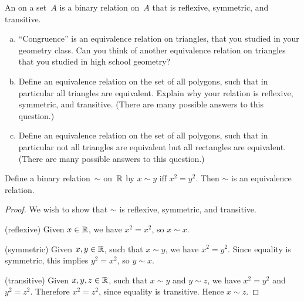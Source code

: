 \begin{defn}
An  on a set~$A$ is a binary relation on~$A$ that is reflexive, symmetric, and transitive.
\end{defn}

\begin{exer}
\begin{enumerate}[(a)]
\item
``Congruence'' is an equivalence relation on triangles, that you studied in your geometry class. Can you think of another equivalence relation on triangles that you studied in high school geometry?
\item
Define an equivalence relation on the set of all polygons, such that in particular all triangles are equivalent. Explain why your relation is reflexive, symmetric, and transitive. (There are many possible answers to this question.)  
\item
Define an equivalence relation on the set of all polygons, such that in particular not all triangles are equivalent but all rectangles are equivalent. (There are many possible answers to this question.)
\end{enumerate}
\end{exer}

\begin{eg}
Define a binary relation~$\sim$ on~$\mathbb{R}$ by $x \sim y$ iff $x^2 = y^2$. Then $\sim$ is an equivalence relation.

\begin{proof}
We wish to show that $\sim$ is reflexive, symmetric, and transitive.

\noindent
(reflexive) Given $x \in \mathbb{R} $, we have $x^2 = x^2$, so $x \sim x$.

\noindent
(symmetric) Given $x,y \in \mathbb{R}$, such that $x \sim y$, we have $x^2 = y^2$. Since equality is symmetric, this implies $y^2 = x^2$, so $y \sim x$.

\noindent
(transitive) Given $x,y,z \in \mathbb{R}$, such that $x \sim y$ and $y \sim z$, we have $x^2 = y^2$ and $y^2 = z^2$. Therefore $x^2 = z^2$, since equality is transitive. Hence $x \sim z$.
\end{proof}
\end{eg}




